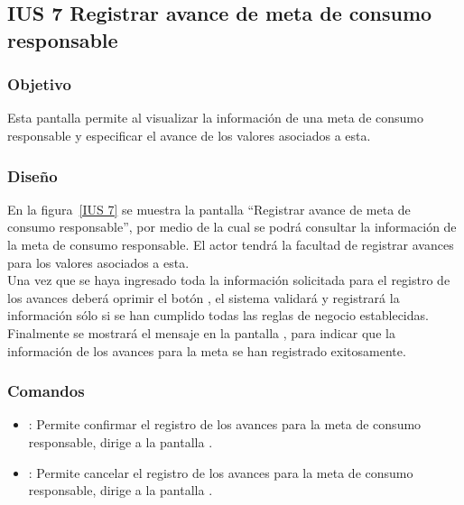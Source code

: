 \subsection{IUS 7 Registrar avance de meta de consumo responsable}

\subsubsection{Objetivo}

Esta pantalla permite al  visualizar la información de una meta de consumo responsable y especificar el avance de los valores asociados a esta.
    
\subsubsection{Diseño}

    En la figura~\ref{IUS 7} se muestra la pantalla ``Registrar avance de meta de consumo responsable'', por medio de la cual se podrá consultar la información de la meta de consumo responsable. El actor tendrá la facultad de registrar avances para los valores asociados a esta.\\
        
    Una vez que se haya ingresado toda la información solicitada para el registro de los avances deberá oprimir el botón , el sistema validará y registrará la información sólo si se han cumplido todas las reglas de negocio establecidas.\\
    
    Finalmente se mostrará el mensaje  en la pantalla , para indicar que la información de los avances para la meta se han registrado exitosamente.
        

\subsubsection{Comandos}
    \begin{itemize} 
    \item {}: Permite confirmar el registro de los avances para la meta de consumo responsable, dirige a la pantalla .
    \item {}: Permite cancelar el registro de los avances para la meta de consumo responsable, dirige a la pantalla .
    \end{itemize}

